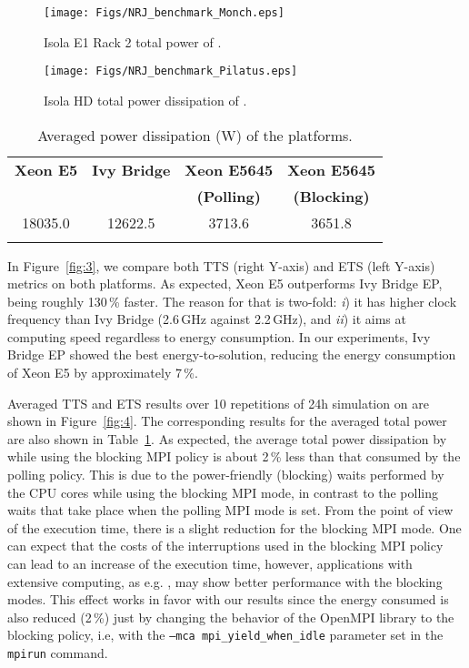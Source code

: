 \begin{figure}[htbf]
  \centering
  \texttt{[image: Figs/NRJ\_benchmark\_Monch.eps]}
    \caption{Isola E1 Rack 2 total power of \monch.}
    \label{fig:1}
\end{figure}

\begin{figure}[htbf]
  \centering
  \texttt{[image: Figs/NRJ\_benchmark\_Pilatus.eps]}
    \caption{Isola HD total power dissipation of \pilat.}
    \label{fig:2}
\end{figure}

\begin{table}[htbf]
  \centering
    \caption{Averaged power dissipation (W) of the platforms.}
    \label{tab:1}
    \begin{tabular}{cccc}
      \hline\noalign{\smallskip}
      \textbf{\scriptsize{Xeon E5}} & \textbf{\scriptsize{Ivy Bridge}} & 
      \textbf{\scriptsize{Xeon  E5645}} & \textbf{\scriptsize{Xeon  E5645}} \\
      & & \textbf{\scriptsize{(Polling)}} & \textbf{\scriptsize{(Blocking)}} \\
      \noalign{\smallskip}\hline\noalign{\smallskip}
      18035.0 & 12622.5 & 3713.6 & 3651.8 \\ 
      \noalign{\smallskip}\hline
    \end{tabular}
  \end{table}

In  Figure~\ref{fig:3}, we  compare both  TTS (right  Y-axis)  and ETS
(left  Y-axis)  metrics  on  both  platforms.  As  expected,  Xeon  E5
outperforms Ivy  Bridge EP, being roughly 130\,\%  faster.  The reason
for that is two-fold: \emph{i}) it has higher clock frequency than Ivy
Bridge  (2.6\,GHz  against  2.2\,GHz),   and  \emph{ii})  it  aims  at
computing speed regardless to energy consumption.  In our experiments,
Ivy Bridge EP showed  the best energy-to-solution, reducing the energy
consumption of Xeon E5 by approximately 7\,\%.

Averaged TTS and ETS results  over 10 repetitions of 24h simulation on
\tinto are shown in  Figure~\ref{fig:4}. The corresponding results for
the  averaged total  power are  also shown  in  Table~\ref{tab:1}.  As
expected, the average total power dissipation by \cosmoart while using
the blocking MPI policy is about  2\,\% less than that consumed by the
polling  policy. This is  due to  the power-friendly  (blocking) waits
performed  by the  CPU cores  while using  the blocking  MPI  mode, in
contrast to  the polling  waits that take  place when the  polling MPI
mode is set. From the point of  view of the execution time, there is a
slight reduction  for the blocking MPI  mode. One can  expect that the
costs of the interruptions used in the blocking MPI policy can lead to
an  increase  of  the   execution  time,  however,  applications  with
extensive computing,  as e.g.  \cosmoart, may show  better performance
with the blocking  modes. This effect works in  favor with our results
since the energy consumed is also reduced (2\,\%) just by changing the
behavior of the OpenMPI library  to the blocking policy, i.e, with the
\texttt{--mca    mpi\_yield\_when\_idle}   parameter   set    in   the
\texttt{mpirun} command.

